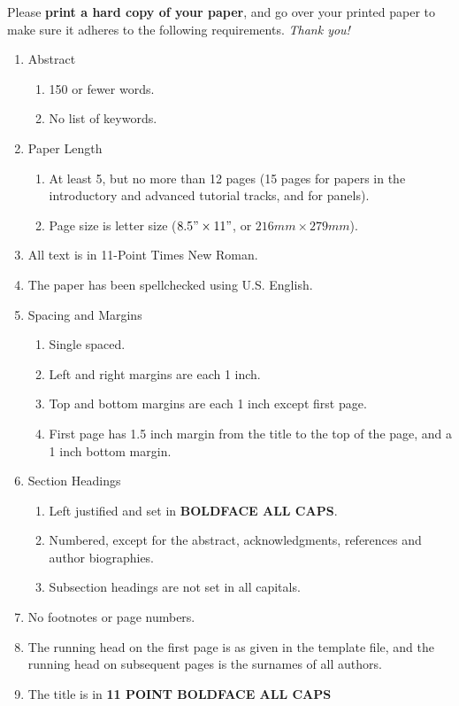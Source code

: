 \documentclass{wscpaperproc}
\theoremstyle{wsc}
\begin{document}
Please {\bf print a hard copy of your paper}, and go over your printed paper to make sure it adheres to the following requirements. {\em Thank you!}
\begin{enumerate}
	\item Abstract
	\begin{enumerate}
		\item 150 or fewer words.
		\item No list of keywords.
	\end{enumerate}
	\item Paper Length
	\begin{enumerate}
		\item At least 5, but no more than 12 pages (15 pages for papers in the introductory and advanced tutorial tracks, and for panels).
	\item Page size is letter size ($8.5" \times 11"$, or $216 mm \times 279 mm$).
	\end{enumerate}
	\item All text is in 11-Point Times New Roman.
	\item The paper has been spellchecked using U.S. English.
	\item Spacing and Margins
	\begin{enumerate}
		\item Single spaced.
		\item Left and right margins are each 1 inch.
		\item Top and bottom margins are each 1 inch except first page.
		\item First page has 1.5 inch margin from the title to the top of the page, and a 1 inch bottom margin.
	\end{enumerate}
	\item Section Headings
	\begin{enumerate}
		\item Left justified and set in {\bf BOLDFACE ALL CAPS}.
		\item Numbered, except for the abstract, acknowledgments, references and author biographies.
		\item Subsection headings are not set in all capitals.
	\end{enumerate}
	\item No footnotes or page numbers.
	\item The running head on the first page is as given in the template file, and the running head on subsequent pages is the surnames of all authors.
	\item The title is in {\bf 11 POINT BOLDFACE ALL CAPS}

\end{enumerate}
\end{document}
